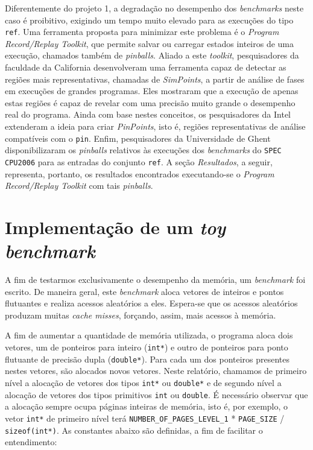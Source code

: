 \documentclass[12pt]{article}
\begin{document}
Diferentemente do projeto 1, a degradação no desempenho dos
\textit{benchmarks} neste caso é proibitivo, exigindo um tempo muito elevado
para as execuções do tipo \texttt{ref}. Uma ferramenta proposta para minimizar
este problema é o \textit{Program Record/Replay Toolkit}, que permite
salvar ou carregar estados inteiros de uma execução, chamados também de
\textit{pinballs}. Aliado a este \textit{toolkit},
pesquisadores da faculdade da California desenvolveram uma ferramenta capaz de
detectar as regiões mais representativas, chamadas de \textit{SimPoints}, a
partir de análise de fases em execuções de grandes programas. Eles mostraram
que a execução de apenas estas regiões é capaz de revelar com uma precisão muito
grande o desempenho real do programa. Ainda com base nestes conceitos, os
pesquisadores da Intel extenderam a ideia para criar \textit{PinPoints}, isto é,
regiões representativas de análise compatíveis com o \texttt{pin}. Enfim,
pesquisadores da Universidade de Ghent disponibilizaram os \textit{pinballs}
relativos às execuções dos \textit{benchmarks} do \texttt{SPEC CPU2006} para as
entradas do conjunto \texttt{ref}. A seção \textit{Resultados}, a seguir,
representa, portanto, os resultados encontrados executando-se o \textit{Program
Record/Replay Toolkit} com tais \textit{pinballs}.

\section {Implementação de um \textit{toy benchmark}}

A fim de testarmos exclusivamente o desempenho da memória, um \textit{benchmark}
foi escrito.  De maneira geral, este \textit{benchmark} aloca vetores de
inteiros e pontos flutuantes e realiza acessos aleatórios a eles. Espera-se que
os acessos aleatórios produzam muitas \textit{cache misses}, forçando, assim,
mais acessos à memória. 

A fim de aumentar a quantidade de memória utilizada, o programa aloca dois
vetores, um de ponteiros para inteiro (\texttt{int*})
e outro de ponteiros para ponto flutuante de precisão dupla (\texttt{double*}).
Para cada um dos ponteiros presentes nestes vetores, são alocados novos vetores. 
Neste relatório, chamamos de primeiro nível a alocação de vetores dos tipos
\texttt{int*} ou \texttt{double*} e de segundo nível a alocação de vetores dos
tipos primitivos \texttt{int} ou \texttt{double}. É necessário observar que a
alocação sempre ocupa páginas inteiras de memória, isto é, por exemplo, o vetor
\texttt{int*} de primeiro nível terá \texttt{NUMBER\_OF\_PAGES\_LEVEL\_1} *
\texttt{PAGE\_SIZE} / \texttt{sizeof(int*)}. As constantes abaixo são
definidas, a fim de facilitar o entendimento:
\end{document}
